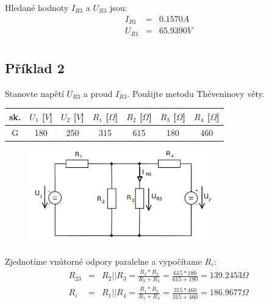 \documentclass[a4paper,oneside,12pt]{article}
\begin{document}
	Hledané hodnoty $I_{R3}$ a $U_{R3}$ jsou:
	\begin{eqnarray*}
		I_{R1} &= & 0.1570A\\
		U_{R1} &= & 65.9390V\\
	\end{eqnarray*}

	\newpage

	\subsection{Příklad 2}

	Stanovte napětí $U_{R3}$ a proud $I_{R3}$. Použijte metodu Théveninovy věty.

	\begin{table}[h]
		\begin{center}
			\begin{tabular}{|c|c|c|c|c|c|c|}
				\hline
				sk. & $U_{1}$ [$V$] & $U_{2}$ [$V$] & $R_{1}$ [$\Omega$] & $R_{2}$ [$\Omega$] & $R_{3}$ [$\Omega$] & $R_{4}$ [$\Omega$]\\
				\hline
				G & 180 & 250 & 315 & 615 & 180 & 460 \\
				\hline
			\end{tabular}
		\end{center}
	\end{table}

	\begin{figure}[h]
		\begin{center}
			\includegraphics[width=8cm,keepaspectratio]{img/pr2.png}
		\end{center}
	\end{figure}

	Zjednotíme vnútorné odpory paralelne a vypočítame $R_{i}$:
	\begin{eqnarray*}
		R_{23} &= & R_{2} || R_{3} = \frac{R_{2} * R_{3}}{R_{2} + R_{3}} = \frac{615 * 180}{615 + 180} = 139.2453 \Omega\\
		R_{i} &= & R_{1} || R_{4} = \frac{R_{1} * R_{4}}{R_{1} + R_{4}} = \frac{315 * 460}{315 + 460} = 186.9677 \Omega\\
	\end{eqnarray*}
\end{document}
